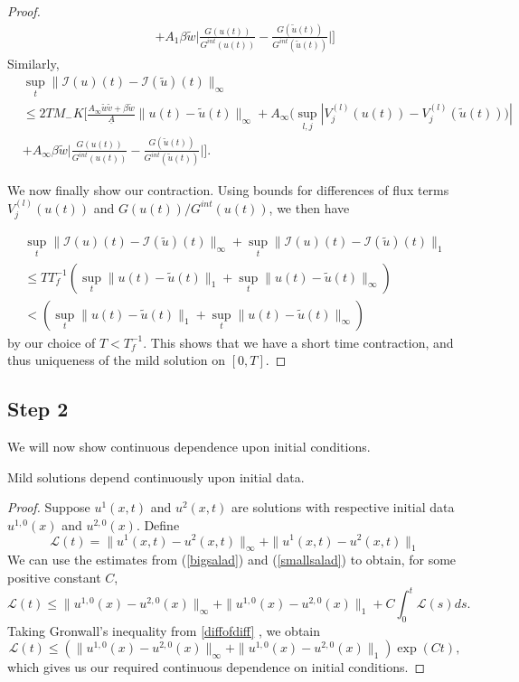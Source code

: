\begin{proof}
\begin{eqnarray}
&&+  A_1\beta\tilde w\big|\frac{G(u(t))}{G^{int}(u(t))} - \frac{G(\tilde u(t))}{G^{int}(\tilde u(t))}\big|\Big]
\nonumber\end{eqnarray}
Similarly,
\begin{align}\label{smallsalad}
&\sup_t\| \mathcal I(u)(t) - \mathcal I(\tilde u)(t)\|_\infty \\
&\le 2TM_{-}K\Big[ \frac{A_\infty \tilde w \tilde v+\beta \tilde w}{\underline{A}} \|u(t)-\tilde u(t)\|_\infty+A_\infty(\sup_{l,j}|V^{(l)}_j(u(t)) -  V^{(l)}_j(\tilde u(t)))|\nonumber\\
&+ A_\infty\beta \tilde w\big|\frac{G(u(t))}{G^{int}(u(t))} - \frac{G(\tilde u(t))}{G^{int}(\tilde u(t))}\big|\Big].\nonumber
\end{align}

We now finally show our contraction. Using bounds for differences of flux terms $V^{(l)}_j (u(t))$ and $G(u(t))/G^{int}(u(t))$, we then have 

\begin{eqnarray}
\sup_t\| \mathcal I(u)(t) - \mathcal I(\tilde u)(t)\|_\infty+\sup_t\| \mathcal I(u)(t) - \mathcal I(\tilde u)(t)\|_1 \\
\le TT_f^{-1}(\sup_t \|u(t)-\tilde u(t)\|_1+\sup_t \|u(t)-\tilde u(t)\|_\infty)\nonumber\\
< (\sup_t \|u(t)-\tilde u(t)\|_1+\sup_t \|u(t)-\tilde u(t)\|_\infty)\nonumber
\end{eqnarray}
by our choice of $T<T_f^{-1}$.
This shows that we have a short time contraction, and thus uniqueness of the mild solution on $[0,T]$.
\end{proof}

\subsection*{Step 2}
We will now show continuous dependence upon initial conditions.
\begin{theorem}\label{contparam} Mild solutions  depend continuously upon initial data.
\end{theorem}
\begin{proof}
Suppose $u^1(x,t)$ and $u^2(x,t)$ are solutions with respective initial data $u^{1,0}(x)$ and $u^{2,0}(x)$. Define 
\begin{equation}
\mathcal L(t)= \|u^1(x,t)-u^2(x,t)\|_\infty+\|u^1(x,t)-u^2(x,t)\|_1
\end{equation}
 We can use the estimates from  (\ref{bigsalad}) and (\ref{smallsalad}) to obtain, for some positive constant $C$,
\begin{equation}\label{diffofdiff}
\mathcal L(t) \le\|u^{1,0}(x)-u^{2,0}(x)\|_\infty+\|u^{1,0}(x)-u^{2,0}(x)\|_1+C\int_0^t \mathcal L(s)ds .
\end{equation} 
  Taking Gronwall's inequality from  \ref{diffofdiff} , we obtain
  \begin{equation}
  \mathcal L(t) \le(\|u^{1,0}(x)-u^{2,0}(x)\|_\infty+\|u^{1,0}(x)-u^{2,0}(x)\|_1)\exp(Ct),
  \end{equation} 
 which gives us our required continuous dependence on initial conditions.
\end{proof}



